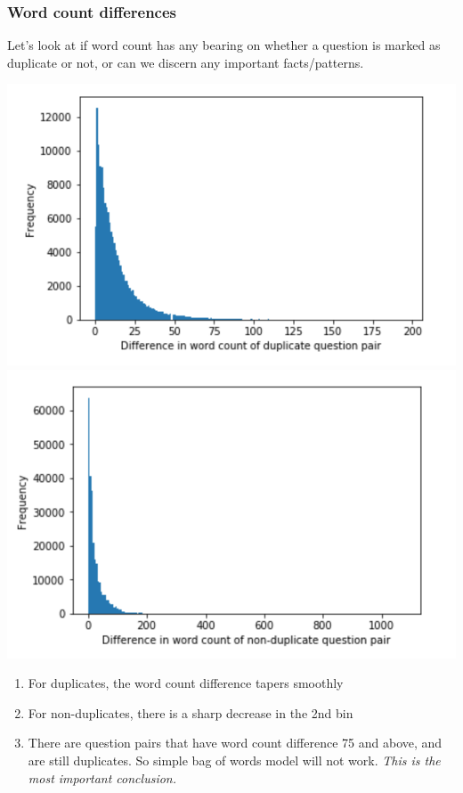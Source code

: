 \documentclass{article}
\begin{document}
\subsubsection{Word count differences}

Let's look at if word count has any bearing on whether a question is marked as duplicate or not, or can we discern any important facts/patterns.

\noindent\includegraphics[width=\textwidth]{diff_wordcount_duplicate}
\noindent\includegraphics[width=\textwidth]{diff_wordcount_non_duplicate}

\begin{enumerate}
\item{For duplicates, the word count difference tapers smoothly}
\item{For non-duplicates, there is a sharp decrease in the 2nd bin}
\item{There are question pairs that have word count difference 75 and above, and are still duplicates. So simple bag of words model will not work. \textit{This is the most important conclusion.}}
\end{enumerate}
\end{document}

